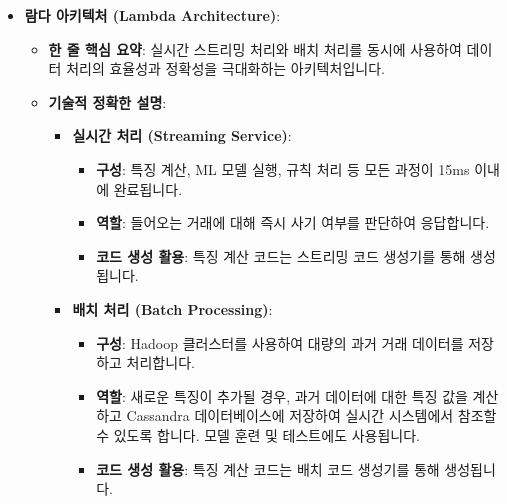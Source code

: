 \documentclass[11pt,a4paper]{article}
\theoremstyle{definition}
\begin{document}
\begin{itemize}
\begin{itemize}
\begin{itemize}
\begin{itemize}
\begin{itemize}
    \item \textbf{람다 아키텍처 (Lambda Architecture)}:
    \begin{itemize}
        \item \textbf{한 줄 핵심 요약}: 실시간 스트리밍 처리와 배치 처리를 동시에 사용하여 데이터 처리의 효율성과 정확성을 극대화하는 아키텍처입니다.
        \item \textbf{기술적 정확한 설명}:
        \begin{itemize}
            \item \textbf{실시간 처리 (Streaming Service)}:
            \begin{itemize}
                \item \textbf{구성}: 특징 계산, ML 모델 실행, 규칙 처리 등 모든 과정이 15ms 이내에 완료됩니다.
                \item \textbf{역할}: 들어오는 거래에 대해 즉시 사기 여부를 판단하여 응답합니다.
                \item \textbf{코드 생성 활용}: 특징 계산 코드는 스트리밍 코드 생성기를 통해 생성됩니다.
            \end{itemize}
            \item \textbf{배치 처리 (Batch Processing)}:
            \begin{itemize}
                \item \textbf{구성}: Hadoop 클러스터를 사용하여 대량의 과거 거래 데이터를 저장하고 처리합니다.
                \item \textbf{역할}: 새로운 특징이 추가될 경우, 과거 데이터에 대한 특징 값을 계산하고 Cassandra 데이터베이스에 저장하여 실시간 시스템에서 참조할 수 있도록 합니다. 모델 훈련 및 테스트에도 사용됩니다.
                \item \textbf{코드 생성 활용}: 특징 계산 코드는 배치 코드 생성기를 통해 생성됩니다.
            \end{itemize}
        \end{itemize}
    \end{itemize}


\end{itemize}
\end{itemize}
\end{itemize}
\end{itemize}
\end{itemize}
\end{document}

